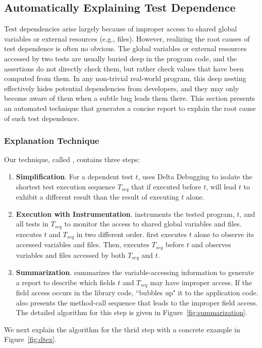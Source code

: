
\subsection{Automatically Explaining Test Dependence}
\label{sec:coperoot}


Test dependencies arise largely because of improper access
to shared global variables or external resources (e.g., files).
However, realizing the root causes of test dependence is often no
obvious.
The global variables or external resources 
accessed by two tests are usually buried deep in
the program code, and the assertions do not directly check
them, but rather check values that have been computed from
them. In any non-trivial real-world program, this deep
nesting effectively hides potential dependencies from developers,
and they may only become aware of them when a subtle bug
leads them there. This section presents an automated
technique that generates a concise report to explain the
root cause of such test dependence.


\subsubsection{Explanation Technique}

Our technique, called \dtexplain, contains three steps:

\begin{enumerate}
\item \textbf{Simplification}. For a dependent test $t$,
\dtexplain uses Delta Debugging to isolate the shortest test
execution sequence $T_{seq}$ that if executed before $t$, will lead
$t$ to exhibit a different result than the result of
executing $t$ alone.

\item \textbf{Execution with Instrumentation}. \dtexplain instruments
the tested program, $t$, and all tests in $T_{seq}$ to monitor
the access to shared global variables and files. \dtexplain 
executes $t$ and $T_{seq}$ in two different order. \dtexplain
first executes $t$ alone to observe its accessed variables
and files. Then, \dtexplain executes $T_{seq}$ before $t$
and observes variables and files accessed by both $T_{seq}$
and $t$.

\item \textbf{Summarization}. \dtexplain summarizes the
variable-accessing information to generate a report to describe
which fields $t$ and $T_{seq}$ may have improper access.
If the field access occurs in the library code, \dtexplain
``bubbles up" it to the application code.
\dtexplain also presents the method-call sequence
that leads to the improper field access. The detailed
algorithm for this step is given in Figure~\ref{fig:summarization}.
\end{enumerate}

We next explain the algorithm for the thrid step with
a concrete example in Figure~\ref{fig:dtex}.
